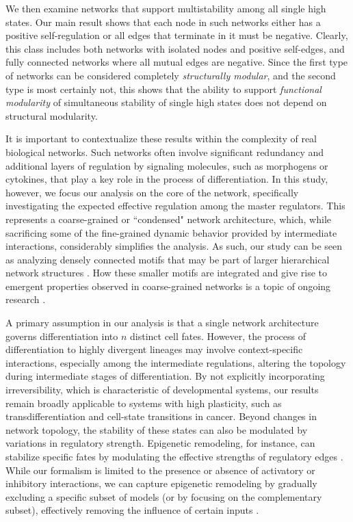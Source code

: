 \documentclass[12pt]{amsart}
\theoremstyle{definition}
\begin{document}
We then examine networks that support multistability among all single high states. Our main result shows that each node in such networks either has a positive self-regulation or all edges that terminate in it must be negative. Clearly, this class includes both networks with isolated nodes and positive self-edges, and fully connected networks where all mutual edges are negative. Since the first type of networks can be considered completely \textit{ structurally modular}, and the second type is most certainly not, this shows that the ability to support \textit{ functional modularity} of simultaneous stability of single high states does not depend on structural modularity.

It is important to contextualize these results within the complexity of real biological networks. Such networks often involve significant redundancy and additional layers of regulation by signaling molecules, such as morphogens or cytokines, that play a key role in the process of differentiation. In this study, however, we focus our analysis on the core of the network, specifically investigating the expected effective regulation among the master regulators. This represents a coarse-grained or ``condensed" network architecture, which, while sacrificing some of the fine-grained dynamic behavior provided by intermediate interactions, considerably simplifies the analysis. As such, our study can be seen as analyzing densely connected motifs that may be part of larger hierarchical network structures \cite{peter_assessing_2017}. How these smaller motifs are integrated and give rise to emergent properties observed in coarse-grained networks is a topic of ongoing research \cite{adler_emergence_2022,singh_network_2026}.

A primary assumption in our analysis is that a single network architecture governs differentiation into $n$ distinct cell fates. However, the process of differentiation to highly divergent lineages may involve context-specific interactions, especially among the intermediate regulations, altering the topology during intermediate stages of differentiation. By not explicitly incorporating irreversibility, which is characteristic of developmental systems, our results remain broadly applicable to systems with high plasticity, such as transdifferentiation and cell-state transitions in cancer. Beyond changes in network topology, the stability of these states can also be modulated by variations in regulatory strength. Epigenetic remodeling, for instance, can stabilize specific fates by modulating the effective strengths of regulatory edges \cite{ghaffarizadeh_multistable_2014}. While our formalism is limited to the presence or absence of activatory or inhibitory interactions, we can capture epigenetic remodeling by gradually excluding a specific subset of models (or by focusing on the complementary subset), effectively removing the influence of certain inputs \cite{zhou_relative_2016}. 
\end{document}
